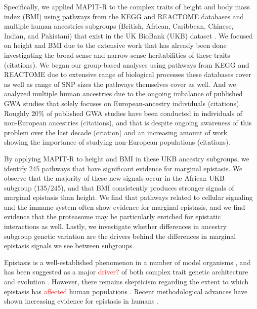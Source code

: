 \documentclass[12pt,a4paper]{article}
\newcommand{\red}[1]{\textcolor{red}{#1}}
\begin{document}
Specifically, we applied MAPIT-R to the complex traits of height and body mass index (BMI) using pathways from the KEGG and REACTOME databases \citep{Liberzon2011} and multiple human ancestries subgroups (British, African, Caribbean, Chinese, Indian, and Pakistani) that exist in the UK BioBank (UKB) dataset \citep{Sudlow2015}. We focused on height and BMI due to the extensive work that has already been done investigating the broad-sense and narrow-sense heritabilities of these traits (citations). We began our group-based analyses using pathways from KEGG and REACTOME due to extensive range of biological processes these databases cover as well as range of SNP sizes the pathways themselves cover as well. And we analyzed multiple human ancestries due to the ongoing imbalance of published GWA studies that solely focuses on European-ancestry individuals (citations). Roughly 20\% of published GWA studies have been conducted in individuals of non-European ancestries (citations), and that is despite ongoing awareness of this problem over the last decade (citation) and an increasing amount of work showing the importance of studying non-European populations (citations). 

By applying MAPIT-R to height and BMI in these UKB ancestry subgroups, we identify 245 pathways that have significant evidence for marginal epistasis. We observe that the majority of these new signals occur in the African UKB subgroup (135/245), and that BMI consistently produces stronger signals of marginal epistasis than height. We find that pathways related to cellular signaling and the immune system often show evidence for marginal epistasis, and we find evidence that the proteasome may be particularly enriched for epistatic interactions as well. Lastly, we investigate whether differences in ancestry subgroup genetic variation are the drivers behind the differences in marginal epistasis signals we see between subgroups. 








Epistasis is a well-established phenomenon in a number of model organisms \citep{Lehner2006,Rowe2008,Shao2008,Flint2009,Costanzo2010,He2010,Jarvis2011,Pettersson2011,Bloom2013,Monnahan2015}, and has been suggested as a major \red{driver?} of both complex trait genetic architecture and evolution \citep{Carlborg2004,Carlborg2006,Martin2007,Phillips2008,Moore2009,Jones2014,Mackay2014}. However, there remains skepticism regarding the extent to which epistasis has \red{affected} human populations \citep{Hill2008,Crow2010,Aschard2012,Wood2014,Yang2015}. Recent methodological advances have shown increasing evidence for epistasis in humans \citep{Verma2016,Crawford2017a,Fang2019,Runcie2019},
\end{document}

